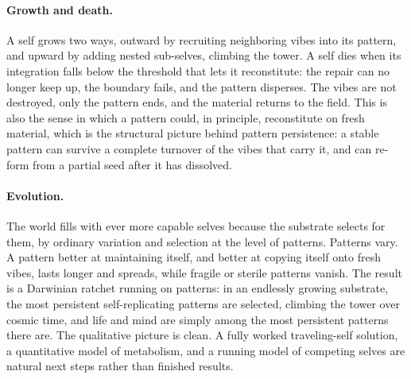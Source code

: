 \paragraph{Growth and death.}
A self grows two ways, outward by recruiting neighboring vibes into its pattern, and upward by
adding nested sub-selves, climbing the tower. A self dies when its integration falls below the
threshold that lets it reconstitute: the repair can no longer keep up, the boundary fails, and
the pattern disperses. The vibes are not destroyed, only the pattern ends, and the material
returns to the field. This is also the sense in which a pattern could, in principle, reconstitute
on fresh material, which is the structural picture behind pattern persistence: a stable pattern
can survive a complete turnover of the vibes that carry it, and can re-form from a partial seed
after it has dissolved.

\paragraph{Evolution.}
The world fills with ever more capable selves because the substrate selects for them, by
ordinary variation and selection at the level of patterns. Patterns vary. A pattern better at
maintaining itself, and better at copying itself onto fresh vibes, lasts longer and spreads,
while fragile or sterile patterns vanish. The result is a Darwinian ratchet running on
patterns: in an endlessly growing substrate, the most persistent self-replicating patterns are
selected, climbing the tower over cosmic time, and life and mind are simply among the most
persistent patterns there are. The qualitative picture is clean. A fully worked traveling-self
solution, a quantitative model of metabolism, and a running model of competing selves are
natural next steps rather than finished results.
